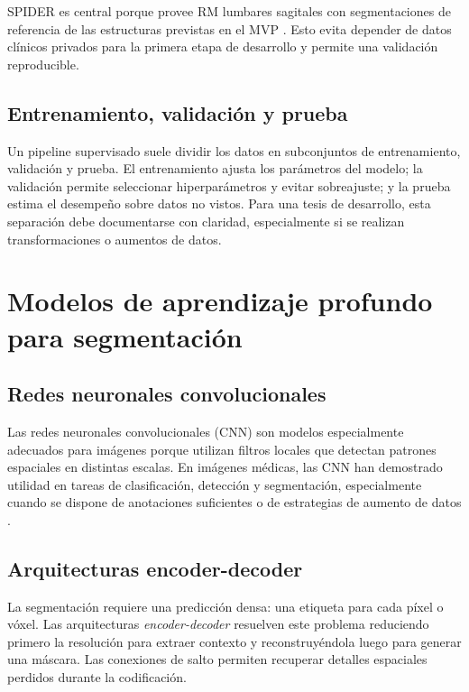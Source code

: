 SPIDER es central porque provee RM lumbares sagitales con segmentaciones de referencia de las estructuras previstas en el MVP \parencite{vandergraaf_spider_2024}. Esto evita depender de datos clínicos privados para la primera etapa de desarrollo y permite una validación reproducible.

\subsection{Entrenamiento, validación y prueba}

Un pipeline supervisado suele dividir los datos en subconjuntos de entrenamiento, validación y prueba. El entrenamiento ajusta los parámetros del modelo; la validación permite seleccionar hiperparámetros y evitar sobreajuste; y la prueba estima el desempeño sobre datos no vistos. Para una tesis de desarrollo, esta separación debe documentarse con claridad, especialmente si se realizan transformaciones o aumentos de datos.

\section{Modelos de aprendizaje profundo para segmentación}

\subsection{Redes neuronales convolucionales}

Las redes neuronales convolucionales (CNN) son modelos especialmente adecuados para imágenes porque utilizan filtros locales que detectan patrones espaciales en distintas escalas. En imágenes médicas, las CNN han demostrado utilidad en tareas de clasificación, detección y segmentación, especialmente cuando se dispone de anotaciones suficientes o de estrategias de aumento de datos \parencite{lecun_deep_learning_2015,litjens_survey_2017}.

\subsection{Arquitecturas encoder-decoder}

La segmentación requiere una predicción densa: una etiqueta para cada píxel o vóxel. Las arquitecturas \textit{encoder-decoder} resuelven este problema reduciendo primero la resolución para extraer contexto y reconstruyéndola luego para generar una máscara. Las conexiones de salto permiten recuperar detalles espaciales perdidos durante la codificación.

